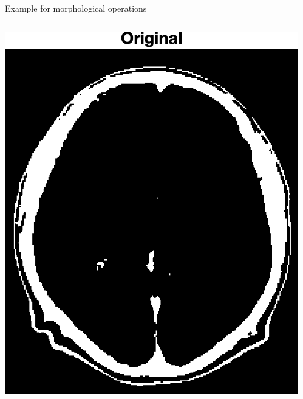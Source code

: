 \begin{frame}{Example for morphological operations}
    \vspace{2.0em}
    \begin{columns}[onlytextwidth,T]
        \begin{column}{0.30\textwidth}
            \centering{}
            \includegraphics[height=0.60\textheight]{images/brain_t200_0_original.png}
        \end{column}
        \begin{column}{0.30\textwidth}
            \centering{}

\end{column}
\end{columns}
\end{frame}
